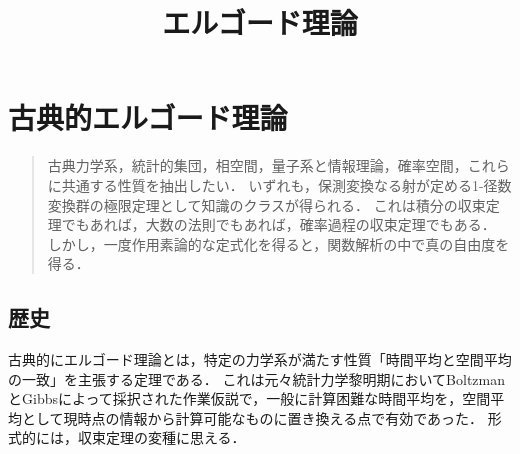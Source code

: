 \documentclass[uplatex,dvipdfmx]{jsreport}
\title{エルゴード理論}
\author{}
\begin{document}
\tableofcontents

\chapter{古典的エルゴード理論}

\begin{quotation}
    古典力学系，統計的集団，相空間，量子系と情報理論，確率空間，これらに共通する性質を抽出したい．
    いずれも，保測変換なる射が定める1-径数変換群の極限定理として知識のクラスが得られる．
    これは積分の収束定理でもあれば，大数の法則でもあれば，確率過程の収束定理でもある．
    しかし，一度作用素論的な定式化を得ると，関数解析の中で真の自由度を得る．
\end{quotation}

\section{歴史}

\begin{tcolorbox}[colframe=ForestGreen, colback=ForestGreen!10!white,breakable,colbacktitle=ForestGreen!40!white,coltitle=black,fonttitle=\bfseries\sffamily,
title=]
古典的にエルゴード理論とは，特定の力学系が満たす性質「時間平均と空間平均の一致」を主張する定理である．
これは元々統計力学黎明期においてBoltzmanとGibbsによって採択された作業仮説で，一般に計算困難な時間平均を，空間平均として現時点の情報から計算可能なものに置き換える点で有効であった．
形式的には，収束定理の変種に思える．
\end{tcolorbox}
\end{document}
